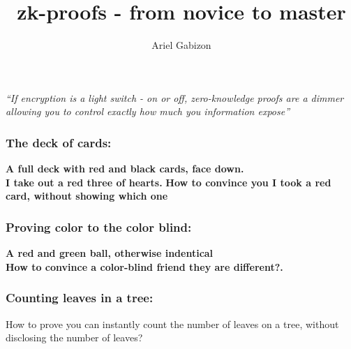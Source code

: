 \documentclass[shadesubsections,compress,14pt,mathserif]{beamer}
\title{\LARGE{zk-proofs - from novice to master}}    %
\author{\Large{Ariel Gabizon}}                 %
\institute{\normalsize{Aztec}}      %
\date{}                    %
\begin{document}
\boldmath
\begin{frame}
  \titlepage
\end{frame}


\begin{frame}
\emph{``If encryption is  a light switch - on or off, zero-knowledge proofs are a dimmer allowing you to control exactly how much you information expose''} 
\end{frame}

\begin{frame}
  \frametitle{The deck of cards:}   %
\textbf{A full deck with red and black cards, face down.}\\
 \vspace{0.4in}
\textbf{I take out a red three of hearts.}
 \vspace{0.4in}
\textbf{How to convince you I took a red card, without showing which one}
\end{frame}
\begin{frame}
  \frametitle{Proving color to the color blind:}   %
\textbf{A red and green ball, otherwise indentical}\\
 \vspace{0.4in}
\textbf{How to convince a color-blind friend they are different?.}
 \vspace{0.4in}

\end{frame}

\begin{frame}
  \frametitle{Counting leaves in a tree:}   %
How to prove you can instantly count the number of leaves on a tree, without disclosing the number of leaves?
\end{frame}
\end{document}
